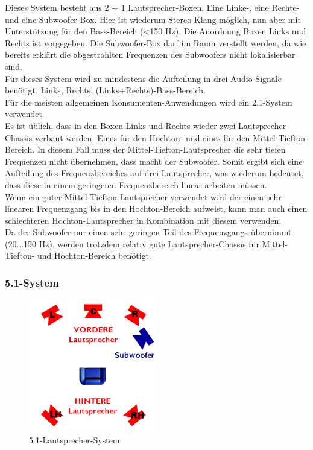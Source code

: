 Dieses System besteht aus 2 + 1 Lautsprecher-Boxen.
Eine Linke-, eine Rechte- und eine Subwoofer-Box.
Hier ist wiederum Stereo-Klang möglich, nun aber mit Unterstützung für den Bass-Bereich (<150 Hz).
Die Anordnung Boxen Links und Rechts ist vorgegeben.
Die Subwoofer-Box darf im Raum verstellt werden, da wie bereits erklärt die abgestrahlten Frequenzen des Subwoofers nicht lokalisierbar sind.\\
Für dieses System wird zu mindestens die Aufteilung in drei Audio-Signale benötigt.
Links, Rechts, (Links+Rechts)-Bass-Bereich.\\
Für die meisten allgemeinen Konsumenten-Anwendungen wird ein 2.1-System verwendet.\\ 
Es ist üblich, dass in den Boxen Links und Rechts wieder zwei Lautsprecher-Chassis verbaut werden.
Eines für den Hochton- und eines für den Mittel-Tiefton-Bereich.
In diesem Fall muss der Mittel-Tiefton-Lautsprecher die sehr tiefen Frequenzen nicht übernehmen, dass macht der Subwoofer.
Somit ergibt sich eine Aufteilung des Frequenzbereiches auf drei Lautsprecher, was wiederum bedeutet, dass diese in einem geringeren Frequenzbereich linear arbeiten müssen.\\
Wenn ein guter Mittel-Tiefton-Lautsprecher verwendet wird der einen sehr linearen Frequenzgang bis in den Hochton-Bereich aufweist, kann man auch einen schlechteren Hochton-Lautsprecher in Kombination mit diesem verwenden.\\
Da der Subwoofer nur einen sehr geringen Teil des Frequenzgangs übernimmt (20...150 Hz), werden trotzdem relativ gute Lautsprecher-Chassis für Mittel-Tiefton- und Hochton-Bereich benötigt.



\subsubsection*{5.1-System}
\begin{figure} [H]
	\centering
	\includegraphics[width=0.5\textwidth]{img/Grundlagen/Mehrweg-Lautsprechersysteme/DOLBYDigital51-cut.jpg}
	\caption{5.1-Lautsprecher-System}
	\label{fig:3.2.6}
\end{figure}

